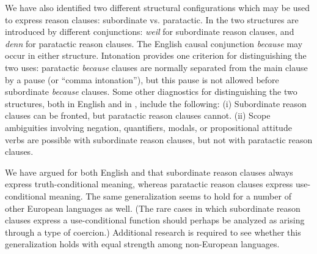We have also identified two different structural configurations which may be used to express reason clauses: subordinate vs. paratactic. In  the two structures are introduced by different conjunctions: \textit{weil} for subordinate reason clauses, and \textit{denn} for paratactic reason clauses. The English causal conjunction \textit{because} may occur in either structure. Intonation provides one criterion for distinguishing the two uses: paratactic \textit{because} clauses are normally separated from the main clause by a pause (or “comma intonation”), but this pause is not allowed before subordinate \textit{because} clauses. Some other diagnostics for distinguishing the two structures, both in English and in , include the following: (i) Subordinate reason clauses can be fronted, but paratactic reason clauses cannot. (ii) Scope ambiguities involving negation, quantifiers, modals, or propositional attitude verbs are possible with subordinate reason clauses, but not with paratactic reason clauses.


We have argued for both English and  that subordinate reason clauses always express truth-conditional meaning, whereas paratactic reason clauses express use-conditional meaning. The same generalization seems to hold for a number of other European languages as well. (The rare cases in which subordinate reason clauses express a use-conditional function should perhaps be analyzed as arising through a type of coercion.) Additional research is required to see whether this generalization holds with equal strength among non-European languages. 




